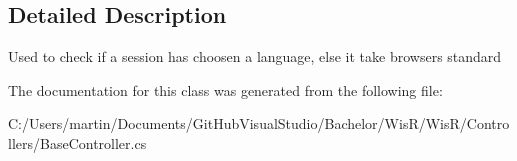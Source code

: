 \subsection{Detailed Description}
Used to check if a session has choosen a language, else it take browsers standard 



The documentation for this class was generated from the following file\+:\begin{DoxyCompactItemize}
\item 
C\+:/\+Users/martin/\+Documents/\+Git\+Hub\+Visual\+Studio/\+Bachelor/\+Wis\+R/\+Wis\+R/\+Controllers/Base\+Controller.\+cs\end{DoxyCompactItemize}
